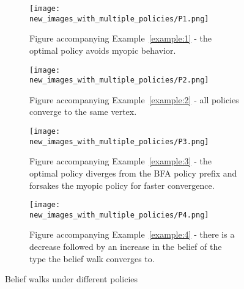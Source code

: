 \begin{figure}
\centering
\begin{subfigure}{0.45\textwidth}
    \texttt{[image: new\_images\_with\_multiple\_policies/P1.png]}
    \caption{Figure accompanying Example~\ref{example:1} - the optimal policy avoids myopic behavior.}
    \label{fig:belief-walk1}
\end{subfigure}
\hfill
\begin{subfigure}{0.45\textwidth}
    \texttt{[image: new\_images\_with\_multiple\_policies/P2.png]}
    \caption{Figure accompanying Example~\ref{example:2} - all policies converge to the same vertex.}
    \label{fig:belief-walk2}
\end{subfigure}

\vspace{1em}

\begin{subfigure}{0.45\textwidth}
    \texttt{[image: new\_images\_with\_multiple\_policies/P3.png]}
    \caption{Figure accompanying Example~\ref{example:3} - the optimal policy diverges from the BFA policy prefix and forsakes the myopic policy for faster convergence.}
    \label{fig:belief-walk3}
\end{subfigure}
\hfill
\begin{subfigure}{0.45\textwidth}
    \texttt{[image: new\_images\_with\_multiple\_policies/P4.png]}
    \caption{Figure accompanying Example~\ref{example:4} - there is a decrease followed by an increase in the belief of the type the belief walk converges to.}
    \label{fig:belief-walk4}
\end{subfigure}
\caption{Belief walks under different policies}
\label{fig:belief-walks}
\end{figure}

